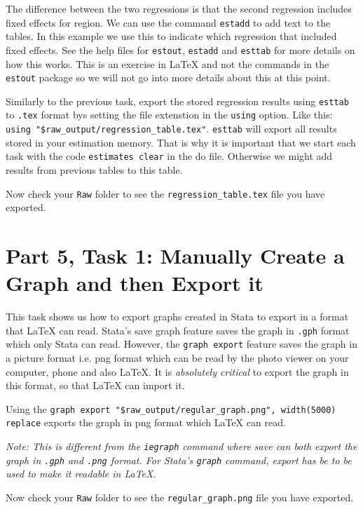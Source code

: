 \documentclass[]{article}
\begin{document}
The difference between the two regressions is that the second regression includes fixed effects for region. We can use the command \texttt{estadd} to add text to the tables. In this example we use this to indicate which regression that included fixed effects. See the help files for \texttt{estout}, \texttt{estadd} and \texttt{esttab} for more details on how this works. This is an exercise in {\LaTeX} and not the commands in the \texttt{estout} package so we will not go into more details about this at this point. 

Similarly to the previous task, export the stored regression results using \texttt{esttab} to \texttt{.tex} format bys setting the file extenstion in the \texttt{using} option. Like this: \verb|using "$raw_output/regression_table.tex"|. \texttt{esttab} will export all results stored in your estimation memory. That is why it is important that we start each task with the code \texttt{estimates 	clear} in the do file. Otherwise we might add results from previous tables to this table.

Now check your \texttt{Raw} folder to see the \texttt{regression\_table.tex} file you have exported.

\section*{Part 5, Task 1: Manually Create a Graph and then Export it}

This task shows us how to export graphs created in Stata to export in a format that {\LaTeX} can read. Stata's save graph feature saves the graph in \texttt{.gph} format which only Stata can read. However, the \texttt{graph export} feature  saves the graph in a picture format i.e. png format which can be read by the photo viewer on your computer, phone and also {\LaTeX}. It is \emph{absolutely critical} to export the graph in this format, so that {\LaTeX} can import it. 

Using the \verb|graph export "$raw_output/regular_graph.png", width(5000) replace| 
exports the graph in png format which {\LaTeX} can read.

\textit{Note: This is different from the \texttt{iegraph} command where save can both export the graph in \texttt{.gph} and \texttt{.png} format. For Stata's \texttt{graph} command, export has be to be used to make it readable in {\LaTeX}}. 

Now check your \texttt{Raw} folder to see the \texttt{regular\_graph.png} file you have exported.
\end{document}
